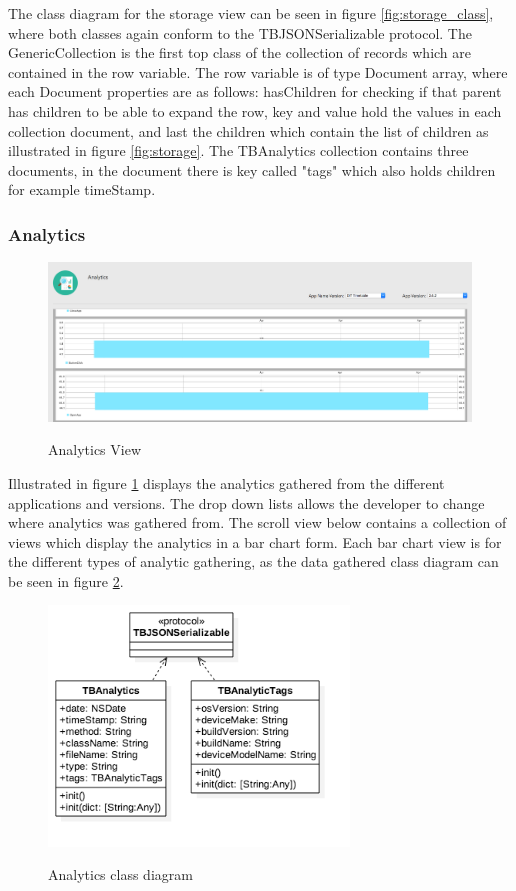 The class diagram for the storage view can be seen in figure \ref{fig:storage_class}, where both classes again conform to the TBJSONSerializable protocol. The GenericCollection is the first top class of the collection of records which are contained in the row variable. The row variable is of type Document array, where each Document properties are as follows: hasChildren for checking if that parent has children to be able to expand the row, key and value hold the values in each collection document, and last the children which contain the list of children as illustrated in figure \ref{fig:storage}. The TBAnalytics collection contains three documents, in the document there is key called "tags" which also holds children for example timeStamp.

\subsubsection{Analytics}

\begin{figure}[!h]
    \caption{Analytics View}
    \centering
    \includegraphics[width=120mm]{images/dashboard/analytics}
    \label{fig:analytics}
\end{figure}

Illustrated in figure \ref{fig:analytics} displays the analytics gathered from the different applications and versions. The drop down lists allows the developer to change where analytics was gathered from. The scroll view below contains a collection of views which display the analytics in a bar chart form. Each bar chart view is for the different types of analytic gathering, as the data gathered class diagram can be seen in figure \ref{fig:analytics_class}.

\begin{figure}[!h]
    \caption{Analytics class diagram}
    \centering
    \includegraphics[width=80mm]{images/classdiagrams/analytics_class}
    \label{fig:analytics_class}
\end{figure}

